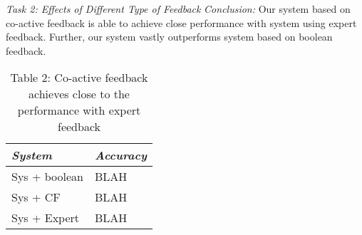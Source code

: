 \noindent\textit{Task 2: Effects of Different Type of Feedback}
\textit{Conclusion:} Our system based on co-active feedback is able to achieve close performance with system using expert feedback. Further, our system vastly outperforms system based on boolean feedback.

\begin{table}
\label{tbl:tsk2}
\caption{Table 2: Co-active feedback achieves close to the performance with expert feedback}
\centering
\begin{tabular}{|l|l|}
\hline
\textit{System} & \textit{Accuracy} \\
\hline
Sys + boolean & BLAH\\
Sys + CF & BLAH \\
Sys + Expert & BLAH \\
\hline
\end{tabular}
\end{table}


